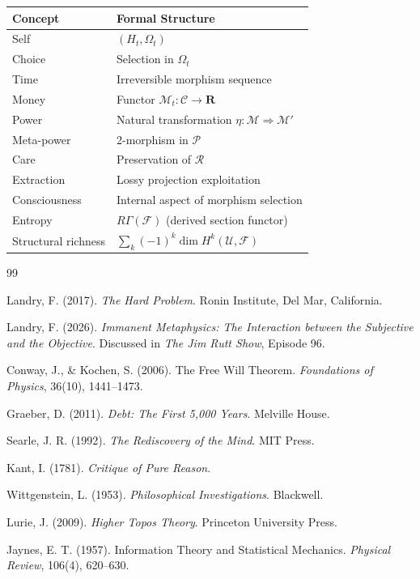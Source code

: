 \documentclass[11pt,a4paper]{article}
\theoremstyle{definition}
\theoremstyle{remark}
\begin{document}
\begin{center}
\begin{tabular}{ll}
\toprule
Concept & Formal Structure \\
\midrule
Self & $(H_t, \Omega_t)$ \\
Choice & Selection in $\Omega_t$ \\
Time & Irreversible morphism sequence \\
Money & Functor $\mathcal{M}_t : \mathcal{C} \to \mathbf{R}$ \\
Power & Natural transformation $\eta : \mathcal{M} \Rightarrow \mathcal{M}'$ \\
Meta-power & 2-morphism in $\mathcal{P}$ \\
Care & Preservation of $\mathcal{R}$ \\
Extraction & Lossy projection exploitation \\
Consciousness & Internal aspect of morphism selection \\
Entropy & $R\Gamma(\mathcal{F})$ (derived section functor) \\
Structural richness & $\sum_k (-1)^k \dim H^k(\mathcal{U}, \mathcal{F})$ \\
\bottomrule
\end{tabular}
\end{center}

\begin{thebibliography}{99}

Landry, F. (2017).
\textit{The Hard Problem}.
Ronin Institute, Del Mar, California.

Landry, F. (2026).
\textit{Immanent Metaphysics: The Interaction between the Subjective and the Objective}.
Discussed in \textit{The Jim Rutt Show}, Episode 96.

Conway, J., \& Kochen, S. (2006).
The Free Will Theorem.
\textit{Foundations of Physics}, 36(10), 1441--1473.

Graeber, D. (2011).
\textit{Debt: The First 5,000 Years}.
Melville House.

Searle, J. R. (1992).
\textit{The Rediscovery of the Mind}.
MIT Press.

Kant, I. (1781).
\textit{Critique of Pure Reason}.

Wittgenstein, L. (1953).
\textit{Philosophical Investigations}.
Blackwell.

Lurie, J. (2009).
\textit{Higher Topos Theory}.
Princeton University Press.

Jaynes, E. T. (1957).
Information Theory and Statistical Mechanics.
\textit{Physical Review}, 106(4), 620--630.

\end{thebibliography}
\end{document}

